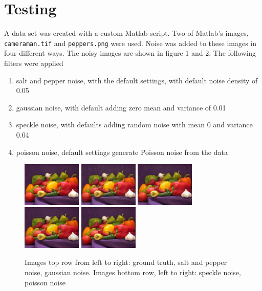 \documentclass{article}
\begin{document}
\section{Testing}
\label{sec:test}
A data set was created with a custom Matlab script. Two of Matlab's images,
\texttt{cameraman.tif} and \texttt{peppers.png} were used. Noise was
added to these images in four different ways. The noisy images are
shown in figure 1 and 2. The following filters
were applied
\begin{enumerate}
  \item salt and pepper noise, with the default settings, with
  default noise density of 0.05
  \item gaussian noise, with default adding zero mean and variance
  of 0.01 
  \item speckle noise, with defaults adding random noise with mean 0
  and variance 0.04 
  \item poisson noise, default settings generate Poisson noise from
  the data
\end{enumerate}
%
\begin{figure}[H]
  \centering
  \includegraphics[width=0.25\textwidth]{images/peps_truth}
  \includegraphics[width=0.25\textwidth]{images/peps_noisy1}
  \includegraphics[width=0.25\textwidth]{images/peps_noisy2}
  \includegraphics[width=0.25\textwidth]{images/peps_noisy3}
  \includegraphics[width=0.25\textwidth]{images/peps_noisy4}
  \caption{Images top row from left to right: ground truth, salt and pepper
    noise, gaussian noise. Images bottom row, left to right: speckle noise, poisson noise}
\end{figure}
\end{document}
